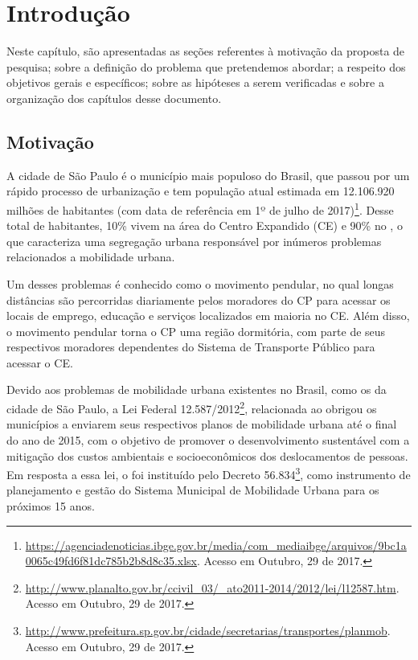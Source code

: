\documentclass[
	12pt,				%
	oneside,			%
	a4paper,			%
	english,			%
	brazil				%
	]{abntex2ppgsi}
\begin{document}
\chapter{Introdução}
\label{introducao}

Neste capítulo, são apresentadas as seções
referentes à motivação da proposta de pesquisa; sobre a definição do problema que pretendemos abordar; a respeito dos objetivos gerais e específicos; sobre as hipóteses a serem verificadas e sobre a organização dos capítulos desse documento.

\section{Motivação}
\label{motivation}

A cidade de São Paulo é o município mais populoso do Brasil, que passou por um rápido processo de urbanização e tem população atual estimada em 12.106.920 milhões de habitantes (com data de referência em 1º de julho de 2017)\footnote{\url{https://agenciadenoticias.ibge.gov.br/media/com\_mediaibge/arquivos/9bc1a0065c49fd6f81dc785b2b8d8c35.xlsx}. Acesso em Outubro, 29 de 2017.}.
Desse total de habitantes, 10\% vivem na área do 
{Centro Expandido (CE)} e 90\% no  \cite{SA201722}, o que caracteriza uma segregação urbana responsável por inúmeros problemas relacionados a mobilidade urbana. 

Um desses problemas é conhecido como o movimento pendular, no qual longas distâncias são percorridas diariamente pelos moradores do CP para acessar os locais de emprego, educação e serviços localizados em maioria no CE. Além disso, o movimento pendular torna o CP  uma região dormitória, com parte de seus respectivos moradores dependentes do Sistema de Transporte Público para acessar o CE.

Devido aos problemas de mobilidade urbana existentes no Brasil, como os da cidade de São Paulo, a Lei Federal 12.587/2012\footnote{\url{http://www.planalto.gov.br/ccivil\_03/\_ato2011-2014/2012/lei/l12587.htm}. Acesso em Outubro, 29 de 2017.}, relacionada ao  obrigou os municípios a enviarem seus respectivos planos de mobilidade urbana até o final do ano de 2015, com o objetivo de promover o desenvolvimento sustentável com a mitigação dos custos ambientais e socioeconômicos dos deslocamentos de pessoas. Em resposta a essa lei, o  foi instituído pelo Decreto 56.834\footnote{\label{planmob}\url{http://www.prefeitura.sp.gov.br/cidade/secretarias/transportes/planmob}. Acesso em Outubro, 29 de 2017.}, como instrumento de planejamento e gestão do Sistema Municipal de Mobilidade Urbana para os próximos 15 anos.
\end{document}
